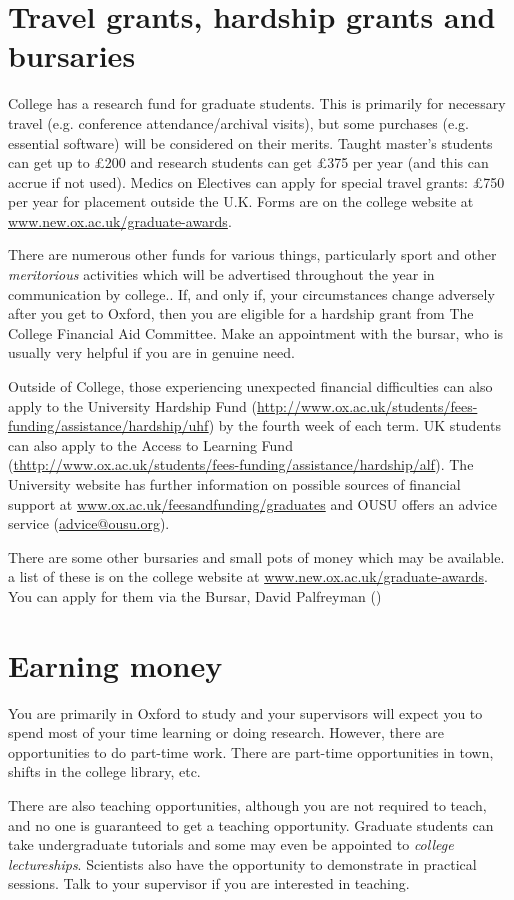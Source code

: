 \section[Grants and bursaries]{Travel grants, hardship grants and bursaries}
College has a research fund for graduate students. This is primarily for necessary travel (e.g. conference attendance/archival visits), but some purchases (e.g. essential software) will be considered on their merits. Taught master's students can get up to \pounds200 and research students can get \pounds375 per year (and this can accrue if not used). Medics on Electives can apply for special travel grants: \pounds750 per year for placement outside the U.K. Forms are on the college website at \url{www.new.ox.ac.uk/graduate-awards}.

There are numerous other funds for various things, particularly sport and other
\emph{meritorious} activities which will be advertised throughout the year in communication by college.. If, and only if, your circumstances change
adversely after you get to Oxford, then you are eligible for a hardship grant from The College Financial Aid Committee. Make an appointment with the bursar, who is usually very helpful if you are in genuine need.

Outside of College, those experiencing unexpected financial difficulties can also apply to the University Hardship Fund (\url{http://www.ox.ac.uk/students/fees-funding/assistance/hardship/uhf}) by the fourth week of each term. UK students can also apply to the Access to Learning Fund (\url{thttp://www.ox.ac.uk/students/fees-funding/assistance/hardship/alf}). The University website has further information on possible sources of financial support at \url{www.ox.ac.uk/feesandfunding/graduates} and OUSU offers an advice service (\url{advice@ousu.org}).

There are some other bursaries and small pots of money which may be available. a list of these is on the college website at \url{www.new.ox.ac.uk/graduate-awards}. You can apply for them via the Bursar, David Palfreyman (\href{mailto:bursar@new.ox.ac.uk}{})

\section{Earning money}
You are primarily in Oxford to study and your supervisors will expect you to spend most of your time learning or doing research. However, there are opportunities to do part-time work. There are part-time opportunities in town, shifts in the college library, etc.

There are also teaching opportunities, although you are not required to teach,
and no one is guaranteed to get a teaching opportunity. Graduate students can
take undergraduate tutorials and some may even be appointed to \emph{college
lectureships}. Scientists also have the opportunity to demonstrate in practical sessions. Talk to your supervisor if you are interested in teaching.

